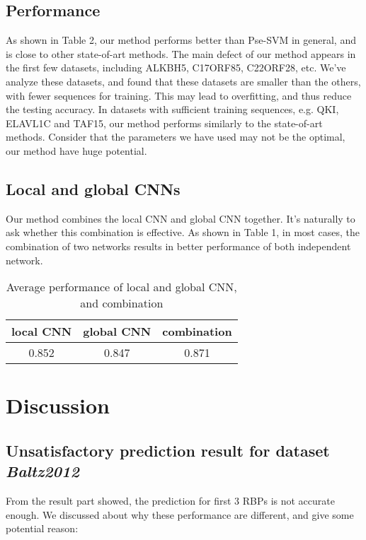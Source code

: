 \documentclass[twoside,twocolumn]{article}
\begin{document}
\subsection{Performance}
As shown in Table 2, our method performs better than Pse-SVM in general,
and is close to other state-of-art methods. The main defect of our method
appears in the first few datasets, including ALKBH5, C17ORF85, C22ORF28, etc.
We've analyze these datasets, and found that these datasets are smaller than the
others, with fewer sequences for training. This may lead to overfitting, and thus
reduce the testing accuracy.
In datasets with sufficient training sequences, e.g. QKI, ELAVL1C and TAF15, our
method performs similarly to the state-of-art methods. Consider that the parameters
we have used may not be the optimal, our method have huge potential.

\subsection{Local and global CNNs}
Our method combines the local CNN and global CNN together. It's naturally to ask
whether this combination is effective. As shown in Table 1, in most cases, the 
combination of two networks results in better performance of both independent
network. 
\begin{table}
  \caption{Average performance of local and global CNN, and combination}
  \centering
  \begin{tabular}{c|c|c}
    \toprule
    local CNN & global CNN & combination \\
    \midrule
    0.852 & 0.847 & 0.871 \\
    \bottomrule
  \end{tabular}
\end{table}


\section{Discussion}

\subsection{Unsatisfactory prediction result for dataset \em Baltz2012}

From the result part showed, the prediction for first 3 RBPs is not accurate enough. We discussed about why these performance are different, and give some potential reason:
\end{document}
